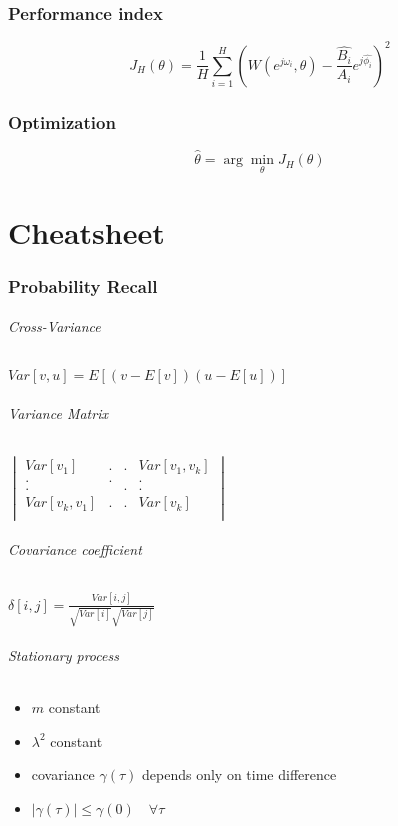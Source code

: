 \documentclass{article}
\begin{document}
\section{Performance index}
\[
J_H(\theta)=
\frac{1}{H}
\sum_{i=1}^H
\left(
W(e^{j\omega_i},\theta)
-
\frac{\hat{B_i}}{A_i}e^{j\hat{\phi_i}}
\right)^2
\]
\section{Optimization}
\[
\hat{\theta}=\arg \min_\theta J_H(\theta)
\]

\newpage
\part{Cheatsheet}
\section{Probability Recall}
\paragraph{Cross-Variance}
$Var[v,u]=E[(v-E[v])(u-E[u])]$
\paragraph{Variance Matrix}
$\begin{vmatrix}
	Var[v_1]			&	.	&	.	&	Var[v_1,v_k]		\\
		.			&	.	&		&		.			\\
		.			&		&	.	&		.			\\
	Var[v_k,v_1]		&	.	&	.	&	Var[v_k]			\\
				
\end{vmatrix}$
\paragraph{Covariance coefficient}
	$\delta[i,j]=\frac{Var[i,j]}{\sqrt{Var[i]}\sqrt{Var[j]}}$
\paragraph{Stationary process}
\begin{itemize}
	\item $m$ constant
	\item $\lambda^2$ constant
	\item covariance $\gamma(\tau)$ depends only on time difference
	\item $|\gamma(\tau)|\leq\gamma(0)		\quad\forall\tau$
\end{itemize}
\end{document}
